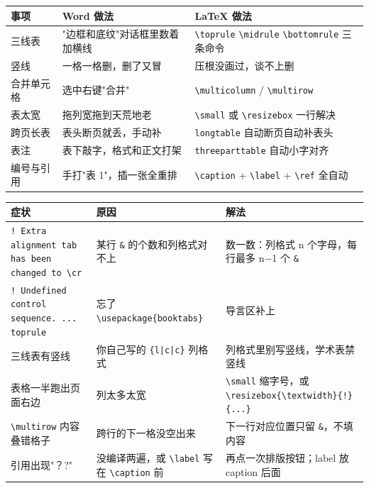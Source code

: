 \begin{table}[htbp]
\centering
\small
\begin{tabularx}{\linewidth}{@{}*{3}{>{\raggedright\arraybackslash}X}@{}}
\toprule
\textbf{事项} & \textbf{Word 做法} & \textbf{LaTeX 做法} \\
\midrule
三线表 & "边框和底纹"对话框里数着加横线 & \texttt{\textbackslash{}toprule} \texttt{\textbackslash{}midrule} \texttt{\textbackslash{}bottomrule} 三条命令 \\
竖线 & 一格一格删，删了又冒 & 压根没画过，谈不上删 \\
合并单元格 & 选中右键"合并" & \texttt{\textbackslash{}multicolumn} / \texttt{\textbackslash{}multirow} \\
表太宽 & 拖列宽拖到天荒地老 & \texttt{\textbackslash{}small} 或 \texttt{\textbackslash{}resizebox} 一行解决 \\
跨页长表 & 表头断页就丢，手动补 & \texttt{longtable} 自动断页自动补表头 \\
表注 & 表下敲字，格式和正文打架 & \texttt{threeparttable} 自动小字对齐 \\
编号与引用 & 手打"表 1"，插一张全重排 & \texttt{\textbackslash{}caption} + \texttt{\textbackslash{}label} + \texttt{\textbackslash{}ref} 全自动 \\
\bottomrule
\end{tabularx}
\end{table}


\begin{table}[htbp]
\centering
\small
\begin{tabularx}{\linewidth}{@{}*{3}{>{\raggedright\arraybackslash}X}@{}}
\toprule
\textbf{症状} & \textbf{原因} & \textbf{解法} \\
\midrule
\texttt{! Extra alignment tab has been changed to \textbackslash{}cr} & 某行 \texttt{\&} 的个数和列格式对不上 & 数一数：列格式 n 个字母，每行最多 n−1 个 \texttt{\&} \\
\texttt{! Undefined control sequence. ... toprule} & 忘了 \texttt{\textbackslash{}usepackage\{booktabs\}} & 导言区补上 \\
三线表有竖线 & 你自己写的 \texttt{\{l|c|c\}} 列格式 & 列格式里别写竖线，学术表禁竖线 \\
表格一半跑出页面右边 & 列太多太宽 & \texttt{\textbackslash{}small} 缩字号，或 \texttt{\textbackslash{}resizebox\{\textbackslash{}textwidth\}\{!\}\{...\}} \\
\texttt{\textbackslash{}multirow} 内容叠错格子 & 跨行的下一格没空出来 & 下一行对应位置只留 \texttt{\&}，不填内容 \\
引用出现"？?" & 没编译两遍，或 \texttt{\textbackslash{}label} 写在 \texttt{\textbackslash{}caption} 前 & 再点一次排版按钮；label 放 caption 后面 \\
\bottomrule
\end{tabularx}
\end{table}

